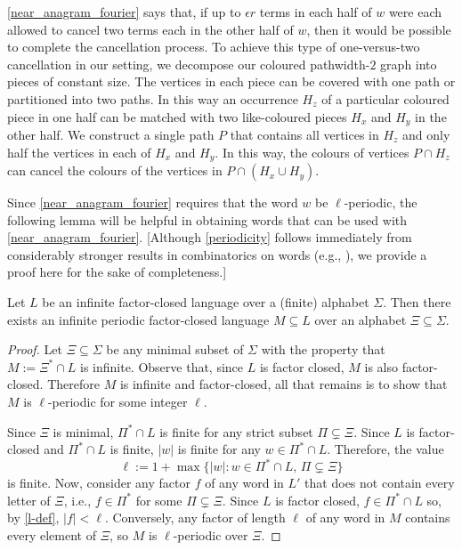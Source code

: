 \documentclass{patmorin}
\begin{document}
\cref{near_anagram_fourier} says that, if up to $\epsilon r$ terms in each half of $w$ were each allowed to cancel two terms each in the other half of $w$, then it would be possible to complete the cancellation process.  To achieve this type of one-versus-two cancellation in our setting, we decompose our coloured pathwidth-$2$ graph into pieces of constant size.  The vertices in each piece can be covered with one path or partitioned into two paths.  In this way an occurrence $H_z$ of a particular coloured piece in one half can be matched with two like-coloured pieces $H_x$ and $H_y$ in the other half. We construct a single path $P$ that contains all vertices in $H_z$ and only half the vertices in each of $H_x$ and $H_y$.  In this way, the colours of vertices $P\cap H_z$ can cancel the colours of the vertices in $P\cap(H_x\cup H_y)$.

Since \cref{near_anagram_fourier} requires that the word $w$ be $\ell$-periodic, the following lemma will be helpful in obtaining words that can be used with \cref{near_anagram_fourier}. [Although \cref{periodicity} follows immediately from considerably stronger results in combinatorics on words (e.g., \citet[Proposition~1.5.12]{lothaire:algebraic}), we provide a proof here for the sake of completeness.]


\begin{lem}\label{periodicity}
    Let $L$ be an infinite factor-closed language over a (finite) alphabet $\Sigma$.  Then there exists an infinite periodic factor-closed language $M\subseteq L$ over an alphabet $\Xi\subseteq \Sigma$.
\end{lem}


\begin{proof}
    Let $\Xi\subseteq\Sigma$ be any minimal subset of $\Sigma$ with the property that $M:=\Xi^* \cap L$ is infinite.  Observe that, since $L$ is factor closed, $M$ is also factor-closed.  Therefore $M$ is infinite and factor-closed, all that remains is to show that $M$ is $\ell$-periodic for some integer $\ell$.

    Since $\Xi$ is minimal, $\Pi^*\cap L$ is finite for any strict subset $\Pi\subsetneq \Xi$.  Since $L$ is factor-closed and $\Pi^*\cap L$ is finite, $|w|$ is finite for any $w\in\Pi^*\cap L$.
    Therefore, the value
    \begin{equation}
        \ell:=1+\max\{|w|: w\in \Pi^*\cap L,\, \Pi\subsetneq\Xi\} \label{l-def}
    \end{equation}
    is finite.  Now, consider any factor $f$ of any word in $L'$ that does not contain every letter of $\Xi$, i.e., $f\in\Pi^*$ for some  $\Pi\subsetneq\Xi$.  Since $L$ is factor closed, $f\in \Pi^*\cap L$ so, by \cref{l-def}, $|f| < \ell$.  Conversely, any factor of length $\ell$ of any word in $M$ contains every element of $\Xi$, so $M$ is $\ell$-periodic over $\Xi$.
\end{proof}
\end{document}
